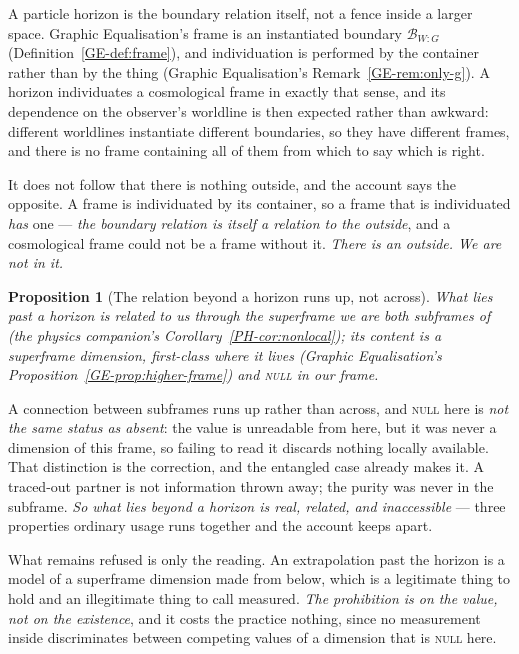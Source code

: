 \documentclass[11pt,a4paper]{article}
\newtheorem{proposition}[definition]{Proposition}
\theoremstyle{remark}\newtheorem{remark}[definition]{Remark}
\begin{document}
A particle horizon is the boundary relation itself, not a fence inside a larger space. Graphic
Equalisation's frame is an instantiated boundary $\mathcal{B}_{W:G}$ (Definition~\ref{GE-def:frame}),
and individuation is performed by the container rather than by the thing (Graphic Equalisation's
Remark~\ref{GE-rem:only-g}). A horizon individuates a cosmological frame in exactly that sense,
and its dependence on the observer's worldline is then expected rather than awkward: different
worldlines instantiate different boundaries, so they have different frames, and there is no frame
containing all of them from which to say which is right.

It does not follow that there is nothing outside, and the account says the opposite. A frame is
individuated by its container, so a frame that is individuated \emph{has} one --- \emph{the boundary
relation is itself a relation to the outside}, and a cosmological frame could not be a frame without it.
\emph{There is an outside. We are not in it.}

\begin{proposition}[The relation beyond a horizon runs up, not across]\label{prop:beyond}
What lies past a horizon is related to us \emph{through the superframe we are both subframes of} (the
physics companion's Corollary~\ref{PH-cor:nonlocal}); its content is a superframe dimension,
first-class where it lives (Graphic Equalisation's Proposition~\ref{GE-prop:higher-frame}) and
\textnormal{\textsc{null}} in our frame.
\end{proposition}

A connection between subframes runs up rather than across, and \textsc{null} here is \emph{not the
same status as absent}: the value is unreadable from here, but it was never a dimension of this frame,
so failing to read it discards nothing locally available. That distinction is the correction, and the
entangled case already makes it. A traced-out partner
is not information thrown away; the purity was never in the subframe. \emph{So what lies beyond a
horizon is real, related, and inaccessible} --- three properties ordinary usage runs together and the
account keeps apart.

What remains refused is only the reading. An extrapolation past the horizon is a model of a
superframe dimension made from below, which is a legitimate thing to hold and an illegitimate thing to
call measured. \emph{The prohibition is on the value, not on the existence}, and it costs the practice
nothing, since no measurement inside discriminates between competing values of a dimension that is
\textsc{null} here.
\end{document}
